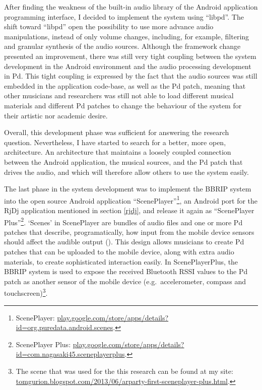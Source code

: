 \documentclass[a4paper,11pt]{article}
\begin{document}
{After finding the weakness of the built-in audio library of the Android application programming interface, I decided to implement the system using ``libpd''.
The shift toward ``libpd'' open the possibility to use more advance audio manipulations, instead of only volume changes, including, for example, filtering and granular synthesis of the audio sources.
Although the framework change presented an improvement, there was still very tight coupling between the system development in the Android environment and the audio processing development in Pd.
This tight coupling is expressed by the fact that the audio sources was still embedded in the application code-base, as well as the Pd patch, meaning that other musicians and researchers was still not able to load different musical materials and different Pd patches to change the behaviour of the system for their artistic nor academic desire.

Overall, this development phase was sufficient for answering the research question.
Nevertheless, I have started to search for a better, more open, architecture.
An architecture that maintains a loosely coupled connection between the Android application, the musical sources, and the Pd patch that drives the audio, and which will therefore allow others to use the system easily.

The last phase in the system development was to implement the BBRIP system into the open source Android application ``ScenePlayer''\footnote{ScenePlayer: \href{http://play.google.com/store/apps/details?id=org.puredata.android.scenes}{play.google.com/store/apps/details?id=org.puredata.android.scenes}.}, an Android port for the RjDj application mentioned in section \ref{rjdj}, and release it again as ``ScenePlayer Plus''\footnote{ScenePlayer Plus: \href{http://play.google.com/store/apps/details?id=com.nagasaki45.sceneplayerplus}{play.google.com/store/apps/details?id=com.nagasaki45.sceneplayerplus}.}.
`Scenes' in ScenePlayer are bundles of audio files and one or more Pd patches that describe, programatically, how input from the mobile device sensors should affect the audible output (\cite[p. 29]{brinkmann12}).
This design allows musicians to create Pd patches that can be uploaded to the mobile device, along with extra audio materials, to create sophisticated interaction easily.
In ScenePlayerPlus, the BBRIP system is used to expose the received Bluetooth RSSI values to the Pd patch as another sensor of the mobile device (e.g.\ accelerometer, compass and touchscreen)\footnote{The scene that was used for the this research can be found at my site: \href{http://tomgurion.blogspot.com/2013/06/arparty-first-sceneplayer-plus.html}{tomgurion.blogspot.com/2013/06/arparty-first-sceneplayer-plus.html}.}.

}
\end{document}
